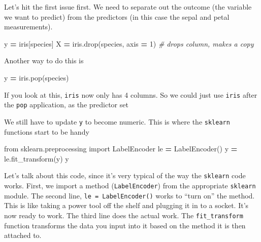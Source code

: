 \documentclass[
  letterpaper,
]{scrbook}
\newenvironment{Shaded}{\begin{snugshade}}{\end{snugshade}}
\newcommand{\CommentTok}[1]{\textcolor[rgb]{0.56,0.35,0.01}{\textit{#1}}}
\newcommand{\DecValTok}[1]{\textcolor[rgb]{0.00,0.00,0.81}{#1}}
\newcommand{\ImportTok}[1]{#1}
\newcommand{\NormalTok}[1]{#1}
\newcommand{\OperatorTok}[1]{\textcolor[rgb]{0.81,0.36,0.00}{\textbf{#1}}}
\newcommand{\StringTok}[1]{\textcolor[rgb]{0.31,0.60,0.02}{#1}}
\begin{document}
Let's hit the first issue first. We need to separate out the outcome (the variable we want to predict) from the predictors (in this case the sepal and petal measurements).

\begin{Shaded}
\begin{Highlighting}[]
\NormalTok{y }\OperatorTok{=}\NormalTok{ iris[}\StringTok{\textquotesingle{}species\textquotesingle{}}\NormalTok{]}
\NormalTok{X }\OperatorTok{=}\NormalTok{ iris.drop(}\StringTok{\textquotesingle{}species\textquotesingle{}}\NormalTok{, axis }\OperatorTok{=} \DecValTok{1}\NormalTok{) }\CommentTok{\# drops column, makes a copy}
\end{Highlighting}
\end{Shaded}

Another way to do this is

\begin{Shaded}
\begin{Highlighting}[]
\NormalTok{y }\OperatorTok{=}\NormalTok{ iris.pop(}\StringTok{\textquotesingle{}species\textquotesingle{}}\NormalTok{)}
\end{Highlighting}
\end{Shaded}

If you look at this, \texttt{iris} now only has 4 columns. So we could just use \texttt{iris} after the \texttt{pop} application, as the predictor set

We still have to update \texttt{y} to become numeric. This is where the \texttt{sklearn} functions start to be handy

\begin{Shaded}
\begin{Highlighting}[]
\ImportTok{from}\NormalTok{ sklearn.preprocessing }\ImportTok{import}\NormalTok{ LabelEncoder}
\NormalTok{le }\OperatorTok{=}\NormalTok{ LabelEncoder()}
\NormalTok{y }\OperatorTok{=}\NormalTok{ le.fit\_transform(y)}
\NormalTok{y}
\end{Highlighting}
\end{Shaded}

Let's talk about this code, since it's very typical of the way the \texttt{sklearn}
code works. First, we import a method (\texttt{LabelEncoder}) from the appropriate
\texttt{sklearn} module. The second line, \texttt{le\ =\ LabelEncoder()} works to ``turn on'' the
method. This is like taking a power tool off the shelf and plugging it in to a
socket. It's now ready to work. The third line does the actual work. The
\texttt{fit\_transform} function transforms the data you input into it based on the
method it is then attached to.
\end{document}
